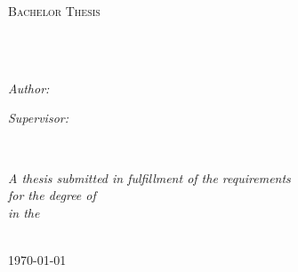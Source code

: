 \documentclass[
11pt, %
english, %
singlespacing, %
headsepline, %
]{MastersDoctoralThesis} %
\begin{document}
\begin{titlepage}
\begin{center}

\vspace*{.06\textheight}
{\scshape\LARGE \univname\par}\vspace{1.5cm} %
\textsc{\Large Bachelor Thesis}\\[0.5cm] %

\HRule \\[0.4cm] %
{\huge \bfseries \ttitle\par}\vspace{0.4cm} %
\HRule \\[1.5cm] %
 
\begin{minipage}[t]{0.4\textwidth}
\begin{flushleft} \large
\emph{Author:}\\
\href{http://www.johnsmith.com}{\authorname} %
\end{flushleft}
\end{minipage}
\begin{minipage}[t]{0.4\textwidth}
\begin{flushright} \large
\emph{Supervisor:} \\
\href{http://www.jamessmith.com}{\supname} %
\end{flushright}
\end{minipage}\\[3cm]
 
\vfill

\large \textit{A thesis submitted in fulfillment of the requirements\\ for the degree of \degreename}\\[0.3cm] %
\textit{in the}\\[0.4cm]
\deptname\\[2cm] %
 
\vfill

{\large \today}\\[4cm] %
 
\vfill
\end{center}
\end{titlepage}
\end{document}
